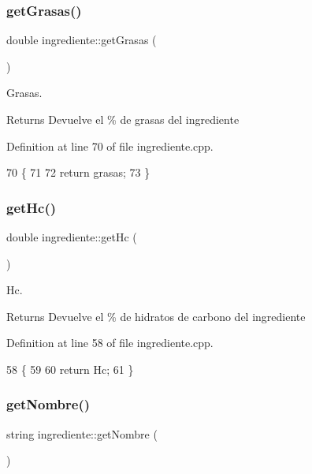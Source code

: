 \subsubsection{\texorpdfstring{get\+Grasas()}{getGrasas()}}
{\footnotesize\ttfamily double ingrediente\+::get\+Grasas (\begin{DoxyParamCaption}{ }\end{DoxyParamCaption})}



Grasas. 

\begin{DoxyReturn}{Returns}
Devuelve el \% de grasas del ingrediente 
\end{DoxyReturn}


Definition at line 70 of file ingrediente.\+cpp.


\begin{DoxyCode}
70                              \{
71 
72     \textcolor{keywordflow}{return} grasas;
73 \}
\end{DoxyCode}
\mbox{\label{classingrediente_abb195921a716feed48c16f6aa5729218}} 
\subsubsection{\texorpdfstring{get\+Hc()}{getHc()}}
{\footnotesize\ttfamily double ingrediente\+::get\+Hc (\begin{DoxyParamCaption}{ }\end{DoxyParamCaption})}



Hc. 

\begin{DoxyReturn}{Returns}
Devuelve el \% de hidratos de carbono del ingrediente 
\end{DoxyReturn}


Definition at line 58 of file ingrediente.\+cpp.


\begin{DoxyCode}
58                          \{
59 
60     \textcolor{keywordflow}{return} Hc;
61 \}
\end{DoxyCode}
\mbox{\label{classingrediente_a1bb43a7c4f04f6ef9b85cb599248fb8e}} 
\subsubsection{\texorpdfstring{get\+Nombre()}{getNombre()}}
{\footnotesize\ttfamily string ingrediente\+::get\+Nombre (\begin{DoxyParamCaption}{ }\end{DoxyParamCaption})}



